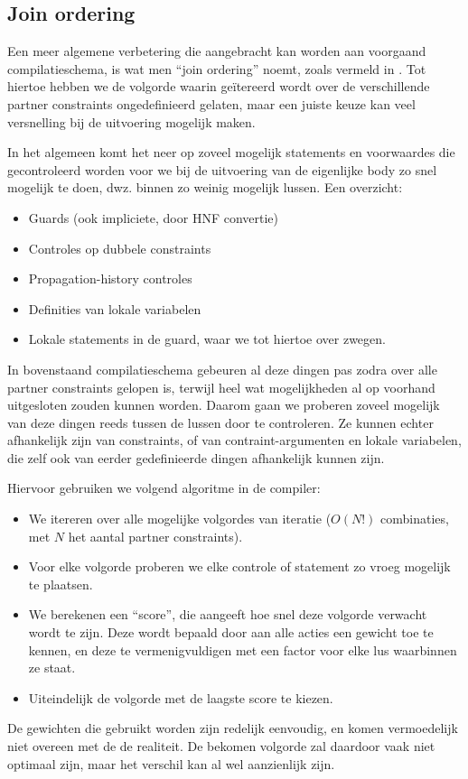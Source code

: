 \subsection{Join ordering} \label{ssec:joinorder}

Een meer algemene verbetering die aangebracht kan worden aan voorgaand compilatieschema, is wat men ``join ordering'' noemt, zoals vermeld in \cite{duck:optimizing}. Tot hiertoe hebben we de volgorde waarin ge\"itereerd wordt over de verschillende partner constraints ongedefinieerd gelaten, maar een juiste keuze kan veel versnelling bij de uitvoering mogelijk maken.

In het algemeen komt het neer op zoveel mogelijk statements en voorwaardes die gecontroleerd worden voor we bij de uitvoering van de eigenlijke body zo snel mogelijk te doen, dwz. binnen zo weinig mogelijk lussen. Een overzicht: \begin{itemize}
  \item Guards (ook impliciete, door HNF convertie)
  \item Controles op dubbele constraints
  \item Propagation-history controles
  \item Definities van lokale variabelen
  \item Lokale statements in de guard, waar we tot hiertoe over zwegen.
\end{itemize}
In bovenstaand compilatieschema gebeuren al deze dingen pas zodra over alle partner constraints gelopen is, terwijl heel wat mogelijkheden al op voorhand uitgesloten zouden kunnen worden. Daarom gaan we proberen zoveel mogelijk van deze dingen reeds tussen de lussen door te controleren. Ze kunnen echter afhankelijk zijn van constraints, of van contraint-argumenten en lokale variabelen, die zelf ook van eerder gedefinieerde dingen afhankelijk kunnen zijn.

Hiervoor gebruiken we volgend algoritme in de compiler: \begin{itemize}
  \item We itereren over alle mogelijke volgordes van iteratie ($O(N!)$ combinaties, met $N$ het aantal partner constraints).
  \item Voor elke volgorde proberen we elke controle of statement zo vroeg mogelijk te plaatsen.
  \item We berekenen een ``score'', die aangeeft hoe snel deze volgorde verwacht wordt te zijn. Deze wordt bepaald door aan alle acties een gewicht toe te kennen, en deze te vermenigvuldigen met een factor voor elke lus waarbinnen ze staat.
  \item Uiteindelijk de volgorde met de laagste score te kiezen.
\end{itemize}
De gewichten die gebruikt worden zijn redelijk eenvoudig, en komen vermoedelijk niet overeen met de de realiteit. De bekomen volgorde zal daardoor vaak niet optimaal zijn, maar het verschil kan al wel aanzienlijk zijn.

